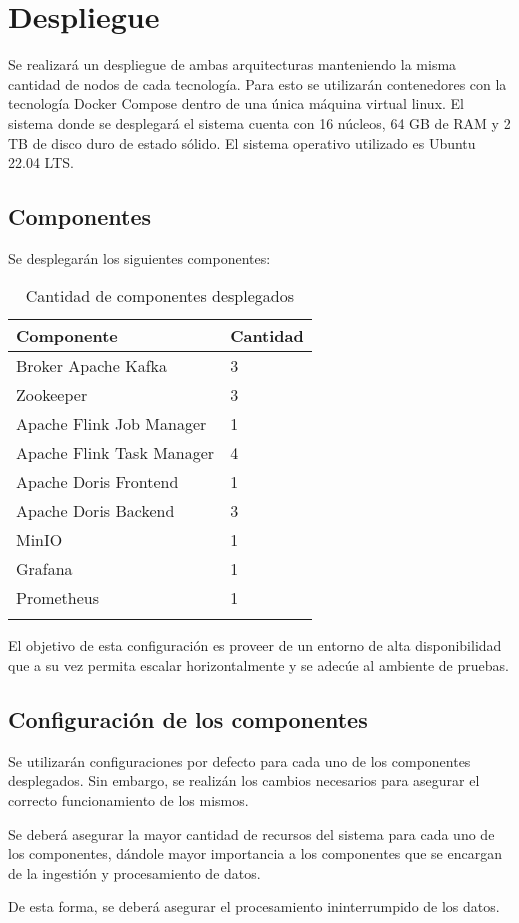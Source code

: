\section{Despliegue}

Se realizará un despliegue de ambas arquitecturas manteniendo la misma cantidad de nodos de cada tecnología.
Para esto se utilizarán contenedores con la tecnología Docker Compose dentro de una única máquina virtual linux.
El sistema donde se desplegará el sistema cuenta con 16 núcleos, 64 GB de RAM y 2 TB de disco duro de estado sólido.
El sistema operativo utilizado es Ubuntu 22.04 LTS.

\subsection{Componentes}

Se desplegarán los siguientes componentes: 

\begin{longtable}{|p{6cm}|p{6cm}|}
    \hline
    \textbf{Componente} & \textbf{Cantidad} \\
    \hline
    \endhead
    Broker Apache Kafka & 3 \\ 
    \hline
    Zookeeper & 3 \\ 
    \hline
    Apache Flink Job Manager & 1 \\ 
    \hline
    Apache Flink Task Manager & 4 \\ 
    \hline
    Apache Doris Frontend & 1 \\ 
    \hline
    Apache Doris Backend & 3 \\ 
    \hline
    MinIO & 1 \\ 
    \hline
    Grafana & 1 \\ 
    \hline
    Prometheus & 1 \\ 
    \hline 
    \caption{Cantidad de componentes desplegados}
    \label{tab:deployed_components}
\end{longtable}

El objetivo de esta configuración es proveer de un entorno de alta disponibilidad que a su vez permita escalar horizontalmente y
se adecúe al ambiente de pruebas.

\newpage

\subsection{Configuración de los componentes}

Se utilizarán configuraciones por defecto para cada uno de los componentes desplegados.
Sin embargo, se realizán los cambios necesarios para asegurar el correcto funcionamiento de los mismos.\newline

Se deberá asegurar la mayor cantidad de recursos del sistema para cada uno de los componentes,
dándole mayor importancia a los componentes que se encargan de la ingestión y procesamiento de datos.\newline

De esta forma, se deberá asegurar el procesamiento ininterrumpido de los datos.